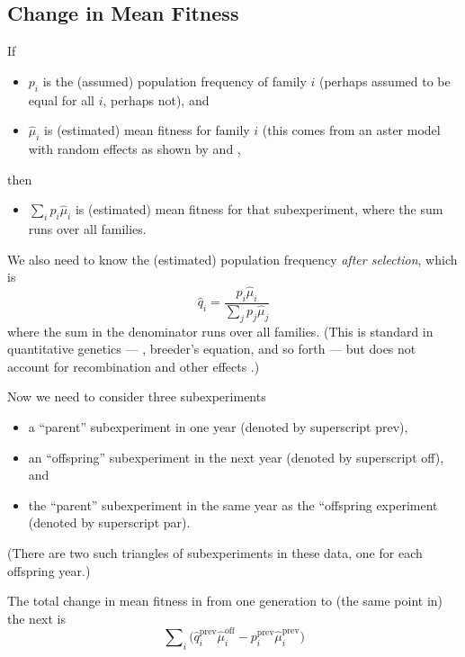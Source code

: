 \documentclass[11pt]{article}
\begin{document}
\subsection{Change in Mean Fitness} \label{sec:change}

If
\begin{itemize}
\item $p_i$ is the (assumed) population frequency of family $i$
    (perhaps assumed to be equal for all $i$, perhaps not), and
\item $\hat{\mu}_i$ is (estimated) mean fitness for family $i$
    (this comes from an aster model with random effects as shown by
    \citet{kulbaba} and \citet{zenodo},
\end{itemize}
then
\begin{itemize}
\item $\sum_i p_i \hat{\mu}_i$ is (estimated) mean fitness for
that subexperiment, where the sum runs over all families.
\end{itemize}

We also need to know the (estimated) population frequency
\emph{after selection}, which is
\begin{equation*}
   \hat{q}_i = \frac{p_i \hat{\mu}_i}{\sum_j p_j \hat{\mu}_j}
\end{equation*}
where the sum in the denominator runs over all families.
(This is standard in quantitative genetics --- \citet{lande-arnold},
breeder's equation,
and so forth --- but does not account for recombination and other effects
\citep{pr70,pr72}.)

Now we need to consider three subexperiments
\begin{itemize}
\item a ``parent'' subexperiment in one year (denoted by superscript prev),
\item an ``offspring'' subexperiment in the next year (denoted
    by superscript off), and
\item the ``parent'' subexperiment in the same year as the ``offspring
    experiment (denoted by superscript par).
\end{itemize}
(There are two such triangles of subexperiments in these data, one
for each offspring year.)

The total change in mean fitness in from one generation to (the same point in) the next is
\begin{equation} \label{eq:total-change}
   \sum\nolimits_i \bigl(
   \hat{q}_i^\text{prev} \hat{\mu}_i^\text{off}
   -
   p_i^\text{prev} \hat{\mu}_i^\text{prev}
   \bigr)
\end{equation}
\end{document}
